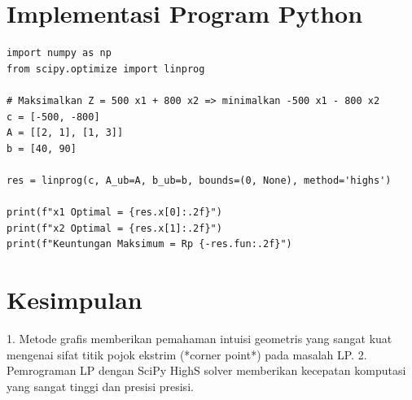 \documentclass[11pt,a4paper]{article}
\begin{document}
\section{Implementasi Program Python}

\begin{lstlisting}[caption={Skrip Python Solusi LP scipy.optimize.linprog}]
import numpy as np
from scipy.optimize import linprog

# Maksimalkan Z = 500 x1 + 800 x2 => minimalkan -500 x1 - 800 x2
c = [-500, -800]
A = [[2, 1], [1, 3]]
b = [40, 90]

res = linprog(c, A_ub=A, b_ub=b, bounds=(0, None), method='highs')

print(f"x1 Optimal = {res.x[0]:.2f}")
print(f"x2 Optimal = {res.x[1]:.2f}")
print(f"Keuntungan Maksimum = Rp {-res.fun:.2f}")
\end{lstlisting}

\section{Kesimpulan}
1. Metode grafis memberikan pemahaman intuisi geometris yang sangat kuat mengenai sifat titik pojok ekstrim (*corner point*) pada masalah LP.
2. Pemrograman LP dengan SciPy HighS solver memberikan kecepatan komputasi yang sangat tinggi dan presisi presisi.
\end{document}
